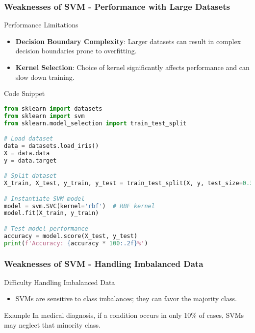 \documentclass[aspectratio=169]{beamer}
\begin{document}
\begin{frame}[fragile]
    \frametitle{Weaknesses of SVM - Performance with Large Datasets}
    \begin{block}{Performance Limitations}
        \begin{itemize}
            \item \textbf{Decision Boundary Complexity}: Larger datasets can result in complex decision boundaries prone to overfitting.
            \item \textbf{Kernel Selection}: Choice of kernel significantly affects performance and can slow down training.
        \end{itemize}
    \end{block}
    
    \begin{block}{Code Snippet}
        \begin{lstlisting}[language=Python]
from sklearn import datasets
from sklearn import svm
from sklearn.model_selection import train_test_split

# Load dataset
data = datasets.load_iris()
X = data.data
y = data.target

# Split dataset
X_train, X_test, y_train, y_test = train_test_split(X, y, test_size=0.3)

# Instantiate SVM model
model = svm.SVC(kernel='rbf')  # RBF kernel
model.fit(X_train, y_train)

# Test model performance
accuracy = model.score(X_test, y_test)
print(f'Accuracy: {accuracy * 100:.2f}%')
        \end{lstlisting}
    \end{block}
\end{frame}

\begin{frame}[fragile]
    \frametitle{Weaknesses of SVM - Handling Imbalanced Data}
    \begin{block}{Difficulty Handling Imbalanced Data}
        \begin{itemize}
            \item SVMs are sensitive to class imbalances; they can favor the majority class.
        \end{itemize}
    \end{block}

    \begin{block}{Example}
        In medical diagnosis, if a condition occurs in only 10\% of cases, SVMs may neglect that minority class.
    \end{block}
\end{frame}
\end{document}
